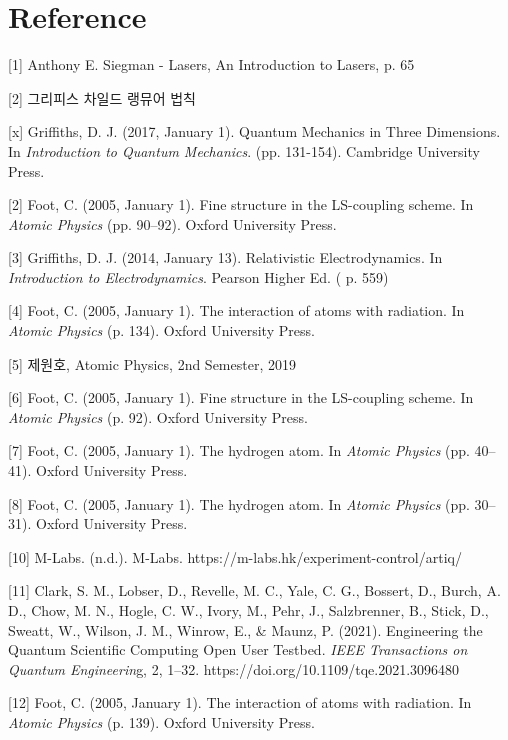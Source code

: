 \documentclass[%
 reprint,
 amsmath,amssymb,
 aps,
]{revtex4-2}
\begin{document}
\section{\label{sec:level1}Reference}
[1] Anthony E. Siegman - Lasers, An Introduction to Lasers, p. 65

[2] 그리피스 차일드 랭뮤어 법칙














[x] Griffiths, D. J. (2017, January 1). Quantum Mechanics in Three Dimensions. In \textit{Introduction to Quantum Mechanics}. (pp. 131-154). Cambridge University Press.

[2] Foot, C. (2005, January 1). Fine structure in the LS-coupling scheme. In \textit{Atomic Physics} (pp. 90–92). Oxford University Press.

[3] Griffiths, D. J. (2014, January 13). Relativistic Electrodynamics. In \textit{Introduction to Electrodynamics}. Pearson Higher Ed. ( p. 559)

[4] Foot, C. (2005, January 1). The interaction of atoms with radiation. In \textit{Atomic Physics} (p. 134). Oxford University Press.

[5] 제원호, Atomic Physics, 2nd Semester, 2019

[6] Foot, C. (2005, January 1). Fine structure in the LS-coupling scheme. In \textit{Atomic Physics} (p. 92). Oxford University Press.

[7] Foot, C. (2005, January 1). The hydrogen atom. In \textit{Atomic Physics} (pp. 40–41). Oxford University Press.

[8]  Foot, C. (2005, January 1). The hydrogen atom. In \textit{Atomic Physics} (pp. 30–31). Oxford University Press.

[10] M-Labs. (n.d.). M-Labs. https://m-labs.hk/experiment-control/artiq/

[11] Clark, S. M., Lobser, D., Revelle, M. C., Yale, C. G., Bossert, D., Burch, A. D., Chow, M. N., Hogle, C. W., Ivory, M., Pehr, J., Salzbrenner, B., Stick, D., Sweatt, W., Wilson, J. M., Winrow, E., \& Maunz, P. (2021). Engineering the Quantum Scientific Computing Open User Testbed. \textit{IEEE Transactions on Quantum Engineerin}g, 2, 1–32. https://doi.org/10.1109/tqe.2021.3096480

[12]  Foot, C. (2005, January 1). The interaction of atoms with radiation. In \textit{Atomic Physics} (p. 139). Oxford University Press.
\end{document}
